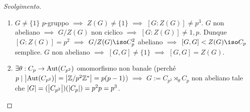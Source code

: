 \begin{proof}[Svolgimento]
\begin{enumerate}
\item $G\ne\{1\}$ $p$-gruppo $\implies$ $Z(G)\ne\{1\}$ $\implies$ $[G:Z(G)]\ne p^3$. $G$ non abeliano $\implies$ $G/Z(G)$ non ciclico $\implies$ $[G:Z(G)]\ne1,p$. Dunque $[G:Z(G)]=p^2$ $\implies$ $G/Z(G)\iso C_p^2$ abeliano $\implies$ $[G,G]<Z(G)\iso C_p$ semplice. $G$ non abeliano $\implies$ $[G,G]\ne\{1\}$ $\implies$ $[G,G]=Z(G)$.
\item $\exists\theta : C_p\to\mathrm{Aut}(C_{p^2})$ omomorfismo non banale (perché $p\mid\left\lvert\mathrm{Aut}(C_{p^2})\right\rvert=\left\lvert\mathbb{Z}/p^2\mathbb{Z}^*\right\rvert=p(p-1)$) $\implies$ $G:=C_{p^2}\rtimes_{\theta}C_p$ non abeliano tale che $\left\lvert G\right\rvert=(\left\lvert C_{p^2}\right\rvert)(\left\lvert C_p\right\rvert)=p^2p=p^3$. \qedhere
\end{enumerate}
\end{proof}
